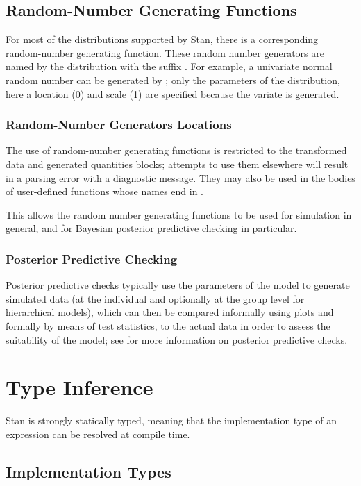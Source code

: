 \subsection{Random-Number Generating Functions}

For most of the distributions supported by Stan, there is a
corresponding random-number generating function.  These random number
generators are named by the distribution with the suffix .
For example, a univariate normal random number can be generated by
;  only the parameters of the distribution,
here a location (0) and scale (1) are specified because the variate is
generated.

\subsubsection{Random-Number Generators Locations}

The use of random-number generating functions is restricted to the
transformed data and generated quantities blocks; attempts to use them
elsewhere will result in a parsing error with a diagnostic message.
They may also be used in the bodies of user-defined functions whose
names end in .

This allows the random number generating functions to be used for
simulation in general, and for Bayesian posterior predictive checking
in particular.

\subsubsection{Posterior Predictive Checking}

Posterior predictive checks typically use the parameters of the model
to generate simulated data (at the individual and optionally at the
group level for hierarchical models), which can then be compared
informally using plots and formally by means of test statistics, to
the actual data in order to assess the suitability of the model; see
\citep[Chapter~6]{GelmanEtAl:2013} for more information on
posterior predictive checks.

\section{Type Inference}

Stan is strongly statically typed, meaning that the implementation
type of an expression can be resolved at compile time.

\subsection{Implementation Types}

